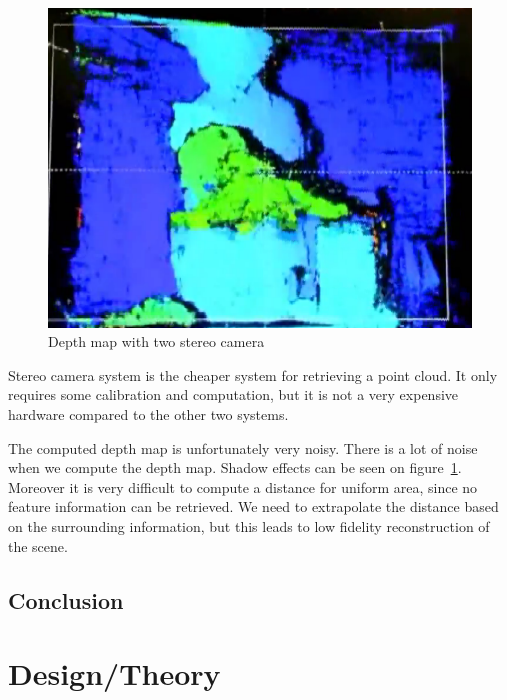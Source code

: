 \documentclass[12pt]{article}
\begin{document}
\begin{figure}[h]
  \centering
  \includegraphics[scale=0.3]{EtronDepth.png}
  \caption{\label{fig:etron} Depth map with two stereo camera}
\end{figure}

Stereo camera system is the cheaper system for retrieving a point cloud. It only requires some calibration and computation, but it is not a very expensive hardware compared to the other two systems.

The computed depth map is unfortunately very noisy. There is a lot of noise when we compute the depth map. Shadow effects can be seen on figure~\ref{fig:etron}. Moreover it is very difficult to compute a distance for uniform area, since no feature information can be retrieved. We need to extrapolate the distance based  on the surrounding information, but this leads to low fidelity reconstruction of the scene.

\subsection{Conclusion}

\newpage
\section{Design/Theory}
\end{document}
